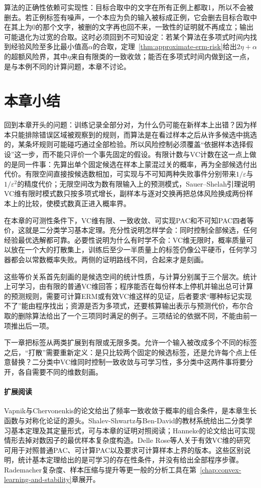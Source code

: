 算法的正确性依赖可实现性：目标合取中的文字在所有正例上都取1，所以不会被删去。若正例标签有噪声，一个本应为负的输入被标成正例，它会删去目标合取中在其上为0的那个文字，被删的文字再也回不来，一致性的证明就不再成立；输出可能退化为过宽的合取。这时必须回到不可知设定：若某个算法在多项式时间内找到经验风险至多比最小值高$\alpha$的合取，定理~\ref{thm:approximate-erm-risk}给出$2\eta+\alpha$的超额风险界，其中$\eta$来自有限类的一致收敛；能否在多项式时间内做到这一点，是与本例不同的计算问题，本章不讨论。

\section{本章小结}
\label{sec:binary-learning-summary}

回到本章开头的问题：训练记录全部分对，为什么仍可能在新样本上出错？因为样本只能排除错误区域被观察到的规则，而算法是在看过样本之后从许多候选中挑选的，某条坏规则可能碰巧通过全部检验。所以风险控制必须覆盖“依据样本选择假设”这一步，而不能只评价一个事先固定的假设。有限计数与VC计数在这一点上做的是同一件事：先算出单个固定候选在样本上蒙混过关的概率，再为全部候选付出代价。有限空间直接按候选数相加，可实现与不可知两种失败事件分别带来$1/\varepsilon$与$1/\varepsilon^2$的精度代价；无限空间改为数有限输入上的预测模式，Sauer--Shelah引理说明VC维有限时模式数只按多项式增长，副样本与逐对交换再把总体风险换成两份样本上的比较，使模式数真正进入概率界。

在本章的可测性条件下，VC维有限、一致收敛、可实现PAC和不可知PAC四者等价，这就是二分类学习基本定理。充分性说明怎样学会：同时控制全部候选，任何经验最优选解都可靠。必要性说明为什么有时学不会：VC维无限时，概率质量可以放在一个大的打散集上，训练后至少一半质量上的标签仍像公平硬币，任何学习器都会以常数概率失败。两侧的证明路线不同，合起来才是刻画。

这些等价关系首先刻画的是候选空间的统计性质，与计算分别属于三个层次。统计上可学习，由有限的普通VC维回答；程序能否在每份样本上停机并输出总可计算的预测规则，需要可计算ERM或有效VC维这样的见证，后者要求“哪种标记实现不了”能由程序找出；资源是否为多项式，还要核算输出表示与预测代价，布尔合取的删除算法给出了一个三项同时满足的例子。三项结论的依据不同，不能由前一项推出后一项。

下一章把标签从两类扩展到有限或无限多类。允许一个输入被改成多个不同的标签之后，“打散”需要重新定义：是只比较两个固定的候选标签，还是允许每个点上任意替换？二分类中VC维同时控制一致收敛与可学习性，多分类中这两件事将要分开，各自需要不同的维数刻画。

\paragraph{扩展阅读}
Vapnik与Chervonenkis的论文给出了频率一致收敛于概率的组合条件，是本章生长函数与对称化论证的源头。Shalev-Shwartz与Ben-David的教材系统给出二分类学习基本定理及其定量形式，可与本章的证明对照阅读；Hanneke的论文给出可实现情形去掉对数因子的最优样本复杂度构造。Delle Rose等人关于有效VC维的研究可用于对照普通PAC、可计算PAC以及要求可计算样本上界的版本。这些区别说明，统计基本定理给出的是可学习的存在性条件，并没有给出全部程序步骤。Rademacher复杂度、样本压缩与提升等更一般的分析工具在第~\ref{chap:convex-learning-and-stability}章展开。
